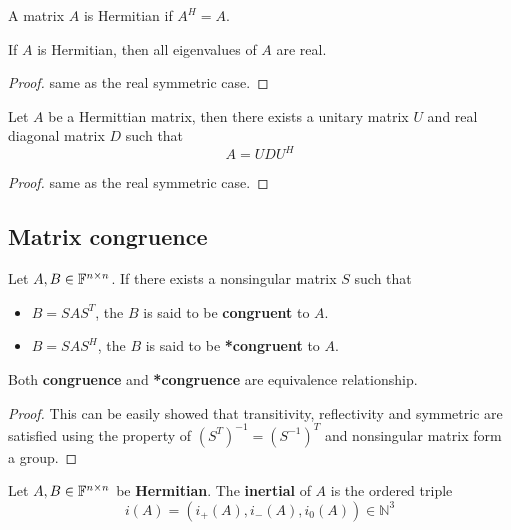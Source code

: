 \begin{refsection}
\begin{definition}
A matrix $A$ is Hermitian if $A^H = A$.
\end{definition}


\begin{theorem}
If $A$ is Hermitian, then all eigenvalues of $A$ are real.
\end{theorem}
\begin{proof}
same as the real symmetric case.
\end{proof}


\begin{theorem}
Let $A$ be a Hermittian matrix, then there exists a unitary matrix $U$ and real diagonal matrix $D$ such that
$$A = UDU^H$$
\end{theorem}
\begin{proof}
	same as the real symmetric case.
\end{proof}

\subsection{Matrix congruence}
\begin{definition}[congruence]\cite[281]{horn2012matrix}
Let $A,B\in \mathbb{F}^{n\times n}$. If there exists a nonsingular matrix $S$ such that 
\begin{itemize}
    \item $B=SAS^T$, the $B$ is said to be \textbf{congruent} to $A$.
    \item $B=SAS^H$, the $B$ is said to be \textbf{*congruent} to $A$.
\end{itemize}
\end{definition}

\begin{lemma}
Both \textbf{congruence} and \textbf{*congruence} are equivalence relationship.
\end{lemma}
\begin{proof}
This can be easily showed that transitivity, reflectivity and symmetric are satisfied using the property of $(S^T)^{-1} = (S^{-1})^T$ and nonsingular matrix form a group.
\end{proof}



\begin{definition}[inertia]\cite[280]{horn2012matrix}
Let $A,B\in \mathbb{F}^{n\times n}$ be \textbf{Hermitian}. The \textbf{inertial} of $A$ is the ordered triple
$$i(A) = (i_+(A),i_-(A),i_0(A))\in \mathbb{N}^3$$
\end{definition}


\end{refsection}
